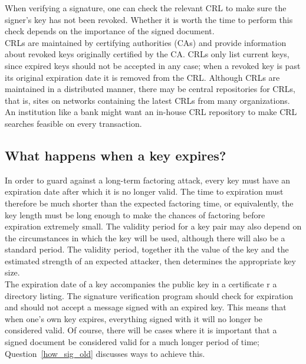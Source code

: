 When verifying a signature, one can check the relevant CRL to make sure
the signer's key has not been revoked. Whether it is worth the time to
perform this check depends on the importance of the signed document.\\

CRLs are maintained by certifying authorities (CAs) and provide
information about revoked keys originally certified by the CA. CRLs
only list current keys, since expired keys should not be accepted in
any case; when a revoked key is past its original expiration date it is
removed from the CRL. Although CRLs are maintained in a distributed
manner, there may be central repositories for CRLs, that is, sites on
networks containing the latest CRLs from many organizations. An
institution like a bank might want an in-house CRL repository to make
CRL searches feasible on every transaction.

\subsection{What happens when a key expires?}
\label{what_key_exp}

In order to guard against a long-term factoring attack, every key must
have an expiration date after which it is no longer valid. The time to
expiration must therefore be much shorter than the expected factoring
time, or equivalently, the key length must be long enough to make the
chances of factoring before expiration extremely small. The validity
period for a key pair may also depend on the circumstances in which the
key will be used, although there will also be a standard period. The
validity period, together ith the value of the key and the estimated
strength of an expected attacker, then determines the appropriate key
size.\\

The expiration date of a key accompanies the public key in a certificate r
a directory listing. The signature verification program should check for
expiration and should not accept a message signed with an expired key. This
means that when one's own key expires, everything signed with it will no
longer be considered valid. Of course, there will be cases where it is
important that a signed document be considered valid for a much longer
period of time; Question~\ref{how_sig_old} discusses ways to achieve this.\\

